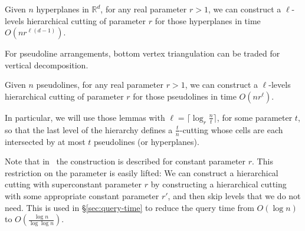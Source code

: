 \ifjournal
\begin{lemma}\label{lem:hierarchical-cutting-d}
  Given \(n\) hyperplanes in \(\mathbb{R}^d\), for any real parameter \(r >
  1\), we can construct a \(\ell\)-levels hierarchical cutting of parameter
  \(r\) for those hyperplanes in time \(O(nr^{\ell(d-1)})\).
\end{lemma}

For pseudoline arrangements, bottom vertex triangulation can be traded for
vertical decomposition.
\begin{lemma}\label{lem:hierarchical-cutting-2}
  Given \(n\) pseudolines, for any real parameter \(r > 1\), we can construct
  a \(\ell\)-levels hierarchical cutting of parameter
  \(r\) for those pseudolines in time \(O(nr^\ell)\).
\end{lemma}

In particular, we will use those lemmas with
\(\ell = \lceil \log_r \frac nt \rceil\),
for some parameter \(t\),
so that the last level of the hierarchy defines a \(\frac
tn\)-cutting whose cells are each intersected by at most \(t\) pseudolines (or
hyperplanes).

Note that in~\cite{C93} the construction is described for constant
parameter \(r\).
This restriction on the parameter is easily lifted:
We can construct a hierarchical
cutting with superconstant parameter \(r\) by constructing a hierarchical
cutting with some appropriate constant parameter \(r'\), and then skip levels that we do
not need. This is used in \S\ref{sec:query-time} to reduce the query time
from \(O(\log n)\) to \(O(\frac{\log n}{\log \log n})\).
\fi
